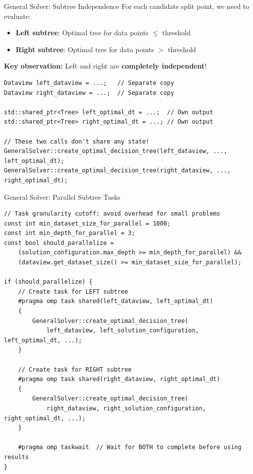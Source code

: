 \documentclass{beamer}
\begin{document}
\begin{frame}[fragile]{General Solver: Subtree Independence}
For each candidate split point, we need to evaluate:
\begin{itemize}
    \item \textbf{Left subtree}: Optimal tree for data points $\leq$ threshold
    \item \textbf{Right subtree}: Optimal tree for data points $>$ threshold
\end{itemize}

\vspace{0.5em}
\textbf{Key observation:} Left and right are \textbf{completely independent}!

\begin{lstlisting}
Dataview left_dataview = ...;   // Separate copy
Dataview right_dataview = ...;  // Separate copy

std::shared_ptr<Tree> left_optimal_dt = ...;  // Own output
std::shared_ptr<Tree> right_optimal_dt = ...; // Own output

// These two calls don't share any state!
GeneralSolver::create_optimal_decision_tree(left_dataview, ..., left_optimal_dt);
GeneralSolver::create_optimal_decision_tree(right_dataview, ..., right_optimal_dt);
\end{lstlisting}
\end{frame}

\begin{frame}[fragile]{General Solver: Parallel Subtree Tasks}
\begin{lstlisting}
// Task granularity cutoff: avoid overhead for small problems
const int min_dataset_size_for_parallel = 1000;
const int min_depth_for_parallel = 3;
const bool should_parallelize = 
    (solution_configuration.max_depth >= min_depth_for_parallel) && 
    (dataview.get_dataset_size() >= min_dataset_size_for_parallel);

if (should_parallelize) {
    // Create task for LEFT subtree
    #pragma omp task shared(left_dataview, left_optimal_dt)
    {
        GeneralSolver::create_optimal_decision_tree(
            left_dataview, left_solution_configuration, left_optimal_dt, ...);
    }
    
    // Create task for RIGHT subtree
    #pragma omp task shared(right_dataview, right_optimal_dt)
    {
        GeneralSolver::create_optimal_decision_tree(
            right_dataview, right_solution_configuration, right_optimal_dt, ...);
    }
    
    #pragma omp taskwait  // Wait for BOTH to complete before using results
}
\end{lstlisting}
\end{frame}
\end{document}
